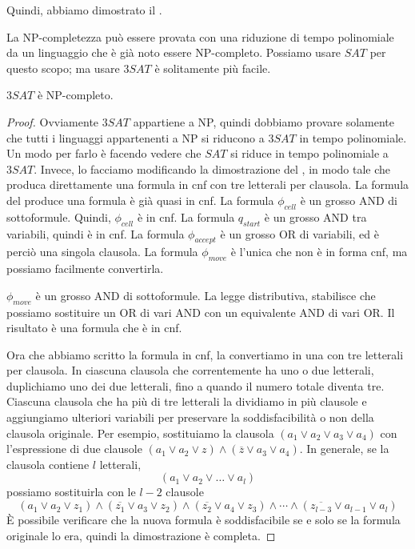 \documentclass[12pt]{report}
\newcounter{corollary}
\newcommand{\namerefl}[1]{%
	\bgroup
	\let\nmu\MakeLowercase
	\nameref{#1}\egroup}
\newcommand{\nmu}{}
\begin{document}
Quindi, abbiamo dimostrato il \namerefl{th:cook_levin}.

La NP-completezza può essere provata con una riduzione di tempo polinomiale da un linguaggio che è già noto essere NP-completo. Possiamo usare $SAT$ per questo scopo; ma usare $3SAT$ è solitamente più facile.
\begin{corollary}{}{}
$3SAT$ è NP-completo.
\end{corollary}
\begin{proof}
	Ovviamente $3SAT$ appartiene a NP, quindi dobbiamo provare solamente che tutti i linguaggi appartenenti a NP si riducono a $3SAT$ in tempo polinomiale. Un modo per farlo è facendo vedere che $SAT$ si riduce in tempo polinomiale a $3SAT$. Invece, lo facciamo modificando la dimostrazione del \namerefl{th:cook_levin}, in modo tale che produca direttamente una formula in cnf con tre letterali per clausola.
	La formula del \namerefl{th:cook_levin} produce una formula è già quasi in cnf. La formula $\phi_{cell}$ è un grosso AND di sottoformule. Quindi, $\phi_{cell}$ è in cnf. La formula $q_{start}$ è un grosso AND tra variabili, quindi è in cnf. La formula $\phi_{accept}$ è un grosso OR di variabili, ed è perciò una singola clausola. La formula $\phi_{move}$ è l'unica che non è in forma cnf, ma possiamo facilmente convertirla.

	$\phi_{move}$ è un grosso AND di sottoformule. La legge distributiva, stabilisce che possiamo sostituire un OR di vari AND con un equivalente AND di vari OR. Il risultato è una formula che è in cnf.

	Ora che abbiamo scritto la formula in cnf, la convertiamo in una con tre letterali per clausola. In ciascuna clausola che correntemente ha uno o due letterali, duplichiamo uno dei due letterali, fino a quando il numero totale diventa tre. Ciascuna clausola che ha più di tre letterali la dividiamo in più clausole e aggiungiamo ulteriori variabili per preservare la soddisfacibilità o non della clausola originale. Per esempio, sostituiamo la clausola $(a_1 \vee a_2 \vee a_3 \vee a_4)$ con l'espressione di due clausole $(a_1 \vee a_2 \vee z) \wedge (\overline{z} \vee a_3 \vee a_4)$. In generale, se la clausola contiene $l$ letterali,
	\[
	(a_1 \vee a_2 \vee \dots \vee a_l)
	\]
	possiamo sostituirla con le $l-2$ clausole
	\[
	(a_1 \vee a_2 \vee z_1) \wedge (\overline{z_1} \vee a_3 \vee z_2) \wedge (\overline{z_2} \vee a_4 \vee z_3) \wedge \cdots \wedge (\overline{z_{l-3}} \vee a_{l-1} \vee a_{l})
	\]
	È possibile verificare che la nuova formula è soddisfacibile se e solo se la formula originale lo era, quindi la dimostrazione è completa.
\end{proof}
\end{document}
